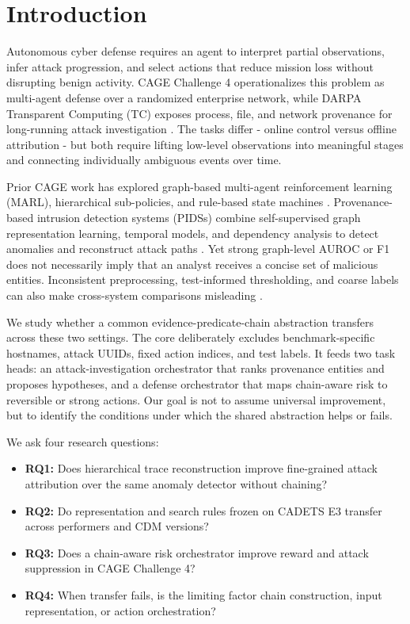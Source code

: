 \documentclass[runningheads]{llncs}
\begin{document}
\section{Introduction}

Autonomous cyber defense requires an agent to interpret partial observations, infer attack progression, and select actions that reduce mission loss without disrupting benign activity. CAGE Challenge 4 operationalizes this problem as multi-agent defense over a randomized enterprise network, while DARPA Transparent Computing (TC) exposes process, file, and network provenance for long-running attack investigation \cite{kiely2025environment,darpa2020tc}. The tasks differ - online control versus offline attribution - but both require lifting low-level observations into meaningful stages and connecting individually ambiguous events over time.

Prior CAGE work has explored graph-based multi-agent reinforcement learning (MARL), hierarchical sub-policies, and rule-based state machines \cite{kiely2025challenge,singh2025hmarl,cybermonic2025code}. Provenance-based intrusion detection systems (PIDSs) combine self-supervised graph representation learning, temporal models, and dependency analysis to detect anomalies and reconstruct attack paths \cite{jia2024magic,cheng2024kairos,jiang2025orthrus}. Yet strong graph-level AUROC or F1 does not necessarily imply that an analyst receives a concise set of malicious entities. Inconsistent preprocessing, test-informed thresholding, and coarse labels can also make cross-system comparisons misleading \cite{bilot2025simpler,abrar2025reproducibility}.

We study whether a common evidence-predicate-chain abstraction transfers across these two settings. The core deliberately excludes benchmark-specific hostnames, attack UUIDs, fixed action indices, and test labels. It feeds two task heads: an attack-investigation orchestrator that ranks provenance entities and proposes hypotheses, and a defense orchestrator that maps chain-aware risk to reversible or strong actions. Our goal is not to assume universal improvement, but to identify the conditions under which the shared abstraction helps or fails.

We ask four research questions:
\begin{itemize}
\item \textbf{RQ1:} Does hierarchical trace reconstruction improve fine-grained attack attribution over the same anomaly detector without chaining?
\item \textbf{RQ2:} Do representation and search rules frozen on CADETS E3 transfer across performers and CDM versions?
\item \textbf{RQ3:} Does a chain-aware risk orchestrator improve reward and attack suppression in CAGE Challenge 4?
\item \textbf{RQ4:} When transfer fails, is the limiting factor chain construction, input representation, or action orchestration?
\end{itemize}
\end{document}
